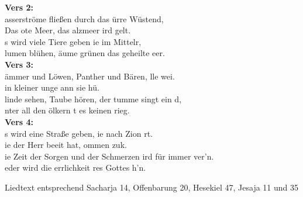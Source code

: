 \textbf{Vers 2:}\\
asserströme fließen durch das ürre Wüstend,\\
Das ote Meer, das alzmeer ird gelt.\\
s wird viele Tiere geben ie im Mittelr,\\
lumen blühen, äume grünen  das geheilte eer.\\

\textbf{Vers 3:}\\
ämmer und Löwen, Panther und Bären, lle wei.\\
in kleiner unge ann sie hü.\\
linde sehen, Taube hören, der tumme singt ein d,\\
nter all den ölkern t es keinen rieg.\\

\textbf{Vers 4:}\\
s wird eine Straße geben, ie nach Zion rt.\\
ie der Herr beeit hat, ommen zuk.\\
ie Zeit der Sorgen und der Schmerzen ird für immer ver'n.\\
eder wird die errlichkeit res Gottes h'n.\\

\begin{footnotesize}
Liedtext entsprechend Sacharja 14, Offenbarung 20, Hesekiel 47, Jesaja 11 und 35
\end{footnotesize}